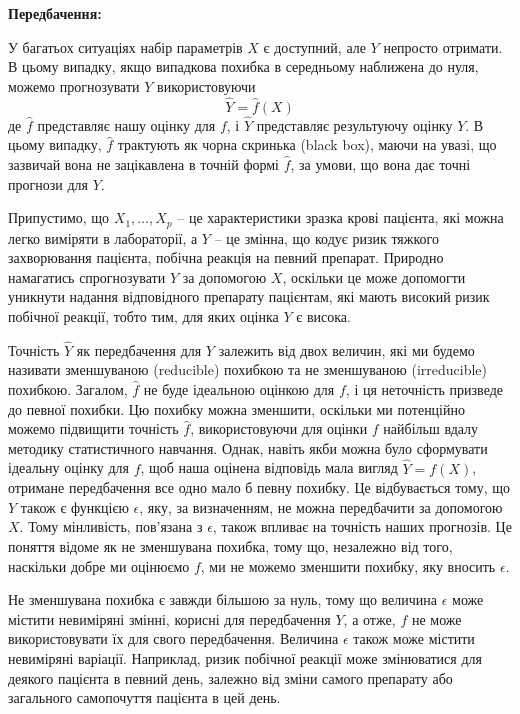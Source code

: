 \documentclass[14pt,a4paper]{extarticle}
\newcounter{e}
\numberwithin{equation}{section}
\numberwithin{figure}{section}
\begin{document}
	\textbf{Передбачення:} \newline
    
    У багатьох ситуаціях набір параметрів $X$ є доступний, але $Y$ непросто отримати. В цьому випадку, якщо випадкова похибка в середньому наближена до нуля, можемо прогнозувати $Y$ використовуючи
    $$
    \hat{Y}=\hat{f}(X)
    $$
    де $\hat{f}$ представляє нашу оцінку для $f$, і $\hat{Y}$ представляє результуючу оцінку $Y$. В цьому випадку, $\hat{f}$ трактують як чорна скринька (black box), маючи на увазі, що зазвичай вона не зацікавлена в точній формі $\hat{f}$, за умови, що вона дає точні прогнози для $Y$. \newline
    
    Припустимо, що $X_{1}, \ldots, X_{p}$ – це характеристики зразка крові пацієнта, які можна легко виміряти в лабораторії, а $Y$ – це змінна, що кодує ризик тяжкого захворювання пацієнта, побічна реакція на певний препарат. Природно намагатись спрогнозувати $Y$ за допомогою $X$, оскільки це може допомогти уникнути надання відповідного препарату пацієнтам, які мають високий ризик побічної реакції, тобто тим, для яких оцінка $Y$ є висока. \newline
    
    Точність $\hat{Y}$ як передбачення для $Y$ залежить від двох величин, які ми будемо називати зменшуваною (reducible) похибкою та не зменшуваною (irreducible) похибкою. Загалом, $\hat{f}$ не буде ідеальною оцінкою для $f$, і ця неточність призведе до певної похибки. Цю похибку можна зменшити, оскільки ми потенційно можемо підвищити точність $\hat{f}$, використовуючи для оцінки $f$ найбільш вдалу методику статистичного навчання. Однак, навіть якби можна було сформувати ідеальну оцінку для $f$, щоб наша оцінена відповідь мала вигляд $\hat{Y}=f(X)$, отримане передбачення все одно мало б певну похибку. Це відбувається тому, що $Y$ також є функцією $\epsilon$, яку, за визначенням, не можна передбачити за допомогою $X$. Тому мінливість, пов’язана з $\epsilon$, також впливає на точність наших прогнозів. Це поняття відоме як не зменшувана похибка, тому що, незалежно від того, наскільки добре ми оцінюємо $f$, ми не можемо зменшити похибку, яку вносить $\epsilon$. \newline
	
	Не зменшувана похибка є завжди більшою за нуль, тому що величина $\epsilon$ може містити невиміряні змінні, корисні для передбачення $Y$, а отже, $f$ не може використовувати їх для свого передбачення. Величина $\epsilon$ також може містити невиміряні варіації. Наприклад, ризик побічної реакції може змінюватися для деякого пацієнта в певний день, залежно від зміни самого препарату або загального самопочуття пацієнта в цей день. \newline
    
\end{document}
